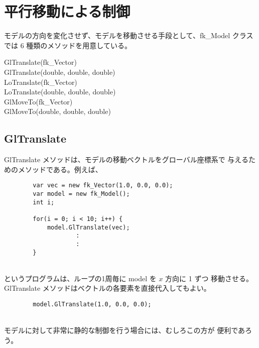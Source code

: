 \section{平行移動による制御}
モデルの方向を変化させず、モデルを移動させる手段として、fk\_Model クラス
では 6 種類のメソッドを用意している。
\begin{description}
\item[GlTranslate(fk\_Vector)]
\item[GlTranslate(double, double, double)]
\item[LoTranslate(fk\_Vector)]
\item[LoTranslate(double, double, double)]
\item[GlMoveTo(fk\_Vector)]
\item[GlMoveTo(double, double, double)]
\end{description}

\subsection{GlTranslate}
GlTranslate メソッドは、モデルの移動ベクトルをグローバル座標系で
与えるためのメソッドである。例えば、
\\
\begin{breakbox}
\begin{verbatim}
        var vec = new fk_Vector(1.0, 0.0, 0.0);
        var model = new fk_Model();
        int i;

        for(i = 0; i < 10; i++) {
            model.GlTranslate(vec);
                    :
                    :
        }
\end{verbatim}
\end{breakbox}
~ \\
というプログラムは、ループの1周毎に model を \(x\) 方向に 1 ずつ
移動させる。GlTranslate メソッドはベクトルの各要素を直接代入してもよい。
\\
\begin{screen}
\begin{verbatim}
        model.GlTranslate(1.0, 0.0, 0.0);
\end{verbatim}
\end{screen}
~ \\
モデルに対して非常に静的な制御を行う場合には、むしろこの方が
便利であろう。
